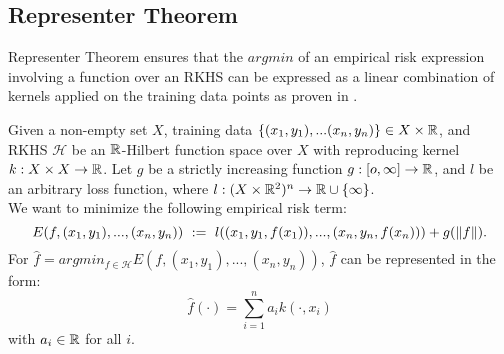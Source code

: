 \documentclass[twoside]{memoir}
\begin{document}
	\subsection{Representer Theorem} \label{subsec:RepThm}
	Representer Theorem ensures that the $argmin$ of an empirical risk expression involving a function over an RKHS can be expressed as a linear combination of kernels applied on the training data points as proven in \cite{Representer_Theorem}.
	\begin{thm} \label{thm:Representer}
		Given a non-empty set $X$, training data $\{(x_1,y_1), ... (x_n,y_n)\} \in X \times \mathbb{R}$, and RKHS $\mathcal{H}$ be an $\mathbb{R}$-Hilbert function space over $X$ with reproducing kernel $k:X \times X \rightarrow \mathbb{R}$. Let $g$ be a strictly increasing function $g:[o, \infty]\rightarrow \mathbb{R}$, and $l$ be an arbitrary loss function, where $l:(X \times \mathbb{R}^2)^n \rightarrow \mathbb{R} \cup \{\infty\}$. \\
		We want to minimize the following empirical risk term:
		\[ E(f, (x_1, y_1), ..., (x_n, y_n)) ~ := ~ l((x_1, y_1, f(x_1)), ..., (x_n, y_n, f(x_n))) + g(\lVert f\rVert) .\]
		For $\hat{f} = argmin_{f \in \mathcal{H}} E(f, (x_1, y_1), ..., (x_n, y_n))$, $\hat{f}$ can be represented in the form:
		\[ \hat{f}(\cdot) = \sum_{i=1}^{n} a_i k(\cdot, x_i) \]
		with $a_i \in \mathbb{R}$ for all $i$.
	\end{thm}
\end{document}
